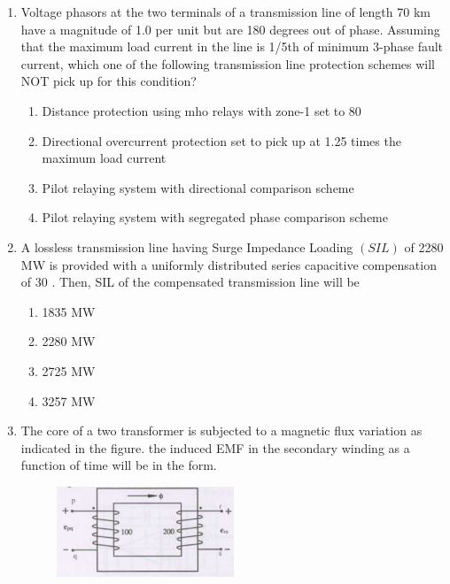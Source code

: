 \documentclass{article}
\newcommand{\brak}[1]{\left( #1 \right)}
\begin{document}
\begin{enumerate}
    \item Voltage phasors at the two terminals of a transmission line of length 70 km have a magnitude of 1.0 per unit but are 180 degrees out of phase. Assuming that the maximum load current in the line  
 is 1/5th of minimum 3-phase fault current, which one of the following transmission line protection schemes will NOT pick up for this condition?  

        \begin{enumerate}
            \item Distance protection using mho relays with zone-1 set to 80%
            \item Directional overcurrent protection set to pick up at 1.25 times the maximum load current
            \item Pilot relaying system with directional comparison scheme
            \item Pilot relaying system with segregated phase comparison scheme
        \end{enumerate}

    \item A lossless transmission line having Surge Impedance Loading          $\brak{SIL}$ of 2280 MW is provided with a uniformly distributed series capacitive compensation of  
 30 . Then, SIL of the compensated transmission line will be  

        \begin{enumerate}
            \item 1835 MW
            \item 2280 MW
            \item 2725 MW
            \item 3257 MW
        \end{enumerate}       


     \item The core of a two transformer is subjected to a magnetic flux variation as indicated in the figure. the induced EMF in the secondary winding as a function of time will be in the form.

   \begin{figure}[h!]
    \centering
      \hspace{-1cm}
      \includegraphics[width=0.5\textwidth]{Screenshot from 2024-10-26 12-11-33.png}
      

\end{figure}
\end{enumerate}
\end{document}
